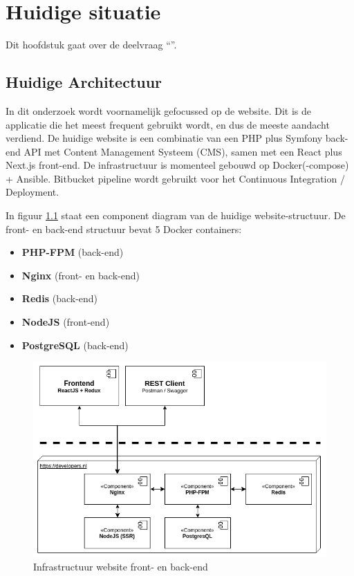 \chapter{Huidige situatie}

\label{Chapter4}

Dit hoofdstuk gaat over de deelvraag \enquote{\deelhuidig}.

\section{Huidige Architectuur}
In dit onderzoek wordt voornamelijk gefocussed op de website. Dit is de applicatie die het meest frequent gebruikt wordt, en dus de meeste aandacht verdiend. De huidige website is een combinatie van een PHP plus Symfony back-end API met Content Management Systeem (CMS), samen met een React plus Next.js front-end. De infrastructuur is momenteel gebouwd op Docker(-compose) + Ansible. Bitbucket pipeline wordt gebruikt voor het Continuous Integration / Deployment. 

In figuur \ref{fig:infra} staat een component diagram van de huidige website-structuur. De front- en back-end structuur bevat 5 Docker containers:
\begin{itemize}
	\item \textbf{PHP-FPM} (back-end)
	\item \textbf{Nginx} (front- en back-end)
	\item \textbf{Redis} (back-end)
	\item \textbf{NodeJS} (front-end)
	\item \textbf{PostgreSQL} (back-end)
\end{itemize}

\begin{figure}
	\centering
	\includegraphics[width=13cm]{Figures/Infrastructure}
	\decoRule
	\caption[Infrastructuur]{Infrastructuur website front- en back-end \parencite{Documentation}}
	\label{fig:infra}
\end{figure}

